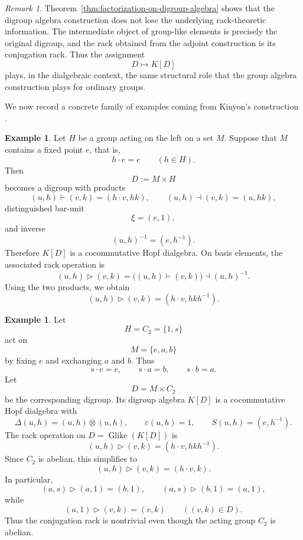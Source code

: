 \documentclass[11pt]{article}
\theoremstyle{plain}
\theoremstyle{definition}
\newtheorem{example}[theorem]{Example}
\theoremstyle{remark}
\newtheorem{remark}[theorem]{Remark}
\DeclareMathOperator{\Glike}{Glike}
\begin{document}
	\begin{remark}\label{rem:digroup-algebra-no-loss}
		Theorem~\ref{thm:factorization-on-digroup-algebra} shows that the digroup
		algebra construction does not lose the underlying rack-theoretic
		information. The intermediate object of group-like elements is precisely
		the original digroup, and the rack obtained from the adjoint construction is
		its conjugation rack. Thus the assignment
		\[
		D\longmapsto K[D]
		\]
		plays, in the dialgebraic context, the same structural role that the group
		algebra construction plays for ordinary groups.
	\end{remark}
	
	We now record a concrete family of examples coming from Kinyon's construction
	\cite{Kinyon}.
	
	\begin{example}\label{ex:kinyon-action-digroup}
		Let \(H\) be a group acting on the left on a set \(M\). Suppose that
		\(M\) contains a fixed point \(e\), that is,
		\[
		h\cdot e=e
		\qquad
		(h\in H).
		\]
		Then
		\[
		D:=M\times H
		\]
		becomes a digroup with products
		\[
		(u,h)\vdash(v,k)=(h\cdot v,hk),
		\qquad
		(u,h)\dashv(v,k)=(u,hk),
		\]
		distinguished bar-unit
		\[
		\xi=(e,1),
		\]
		and inverse
		\[
		(u,h)^{-1}=(e,h^{-1}).
		\]
		Therefore \(K[D]\) is a cocommutative Hopf dialgebra. On basis elements,
		the associated rack operation is
		\[
		(u,h)\triangleright(v,k)
		=
		\bigl((u,h)\vdash(v,k)\bigr)\dashv (u,h)^{-1}.
		\]
		Using the two products, we obtain
		\[
		(u,h)\triangleright(v,k)
		=
		(h\cdot v,hkh^{-1}).
		\]
	\end{example}
	
	\begin{example}\label{ex:C2-digroup}
		Let
		\[
		H=C_2=\{1,s\}
		\]
		act on
		\[
		M=\{e,a,b\}
		\]
		by fixing \(e\) and exchanging \(a\) and \(b\). Thus
		\[
		s\cdot e=e,
		\qquad
		s\cdot a=b,
		\qquad
		s\cdot b=a.
		\]
		Let
		\[
		D=M\times C_2
		\]
		be the corresponding digroup. Its digroup algebra \(K[D]\) is a
		cocommutative Hopf dialgebra with
		\[
		\Delta(u,h)=(u,h)\otimes(u,h),
		\qquad
		\varepsilon(u,h)=1,
		\qquad
		S(u,h)=(e,h^{-1}).
		\]
		The rack operation on \(D=\Glike(K[D])\) is
		\[
		(u,h)\triangleright(v,k)
		=
		(h\cdot v,hkh^{-1}).
		\]
		Since \(C_2\) is abelian, this simplifies to
		\[
		(u,h)\triangleright(v,k)
		=
		(h\cdot v,k).
		\]
		In particular,
		\[
		(a,s)\triangleright(a,1)=(b,1),
		\qquad
		(a,s)\triangleright(b,1)=(a,1),
		\]
		while
		\[
		(a,1)\triangleright(v,k)=(v,k)
		\qquad
		((v,k)\in D).
		\]
		Thus the conjugation rack is nontrivial even though the acting group
		\(C_2\) is abelian.
	\end{example}
	
\end{document}
